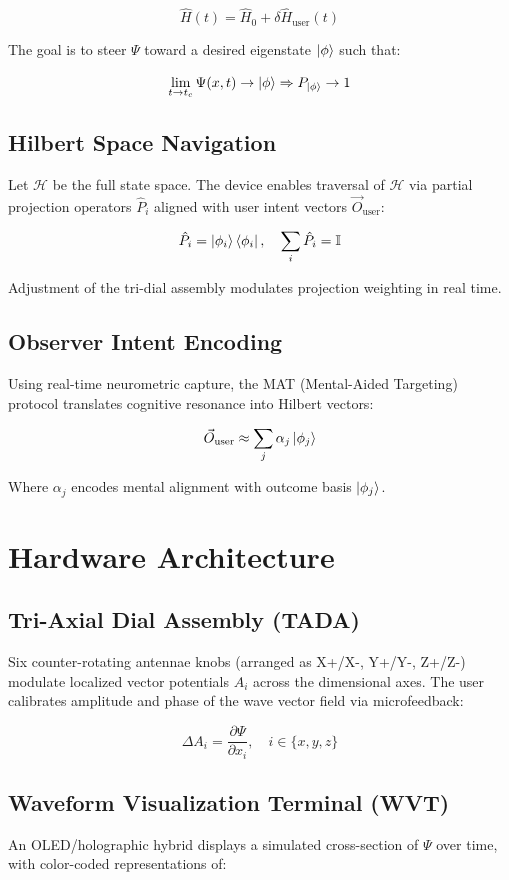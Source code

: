 \documentclass[12pt]{article}
\begin{document}
\[
\hat{H}(t) = \hat{H}_0 + \delta \hat{H}_{\text{user}}(t)
\]

The goal is to steer $\Psi$ toward a desired eigenstate $\ket{\phi}$ such that:

\[
\lim_{t \to t_c} \Psi(x,t) \to \ket{\phi} \Rightarrow P_{\ket{\phi}} \to 1
\]

\subsection{Hilbert Space Navigation}
Let $\mathcal{H}$ be the full state space. The device enables traversal of $\mathcal{H}$ via partial projection operators $\hat{P}_i$ aligned with user intent vectors $\vec{O}_{\text{user}}$:

\[
\hat{P}_i = \ket{\phi_i}\bra{\phi_i}, \quad \sum_i \hat{P}_i = \mathbb{I}
\]

Adjustment of the tri-dial assembly modulates projection weighting in real time.

\subsection{Observer Intent Encoding}
Using real-time neurometric capture, the MAT (Mental-Aided Targeting) protocol translates cognitive resonance into Hilbert vectors:

\[
\vec{O}_{\text{user}} \approx \sum_j \alpha_j \ket{\phi_j}
\]

Where $\alpha_j$ encodes mental alignment with outcome basis $\ket{\phi_j}$.

\section{Hardware Architecture}

\subsection{Tri-Axial Dial Assembly (TADA)}
Six counter-rotating antennae knobs (arranged as X+/X-, Y+/Y-, Z+/Z-) modulate localized vector potentials $A_i$ across the dimensional axes. The user calibrates amplitude and phase of the wave vector field via microfeedback:

\[
\Delta A_i = \frac{\partial \Psi}{\partial x_i}, \quad i \in \{x, y, z\}
\]

\subsection{Waveform Visualization Terminal (WVT)}
An OLED/holographic hybrid displays a simulated cross-section of $\Psi$ over time, with color-coded representations of:
\end{document}
